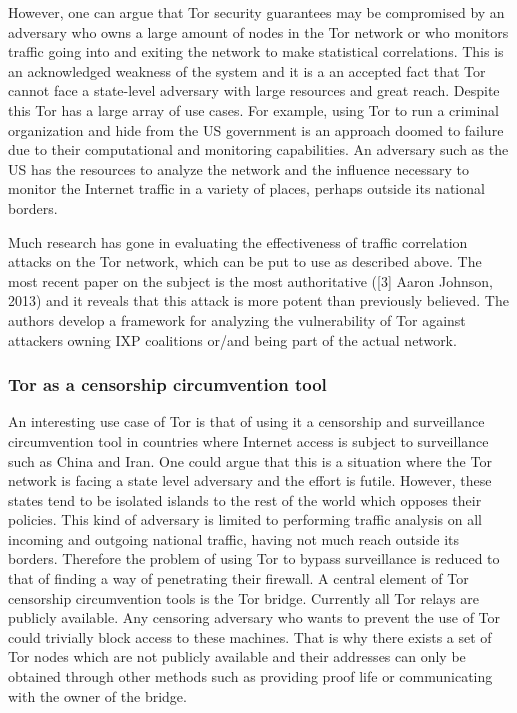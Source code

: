 \documentclass[11pt]{article} %
\begin{document}
However, one can argue that Tor security guarantees may be compromised by an adversary who owns a large amount of nodes in the Tor network or who monitors traffic going into and exiting the network to make statistical correlations. This is an acknowledged weakness of the system and it is a an accepted fact that Tor cannot face a state-level adversary with large resources and great reach. Despite this Tor has a large array of use cases. For example, using Tor to run a criminal organization and hide from the US government is an approach doomed to failure due to their computational and monitoring capabilities. An adversary such as the US has the resources to analyze the network and the influence necessary to monitor the Internet traffic in a variety of places, perhaps outside its national borders.

Much research has gone in evaluating the effectiveness of traffic correlation attacks on the Tor network, which can be put to use as described above. The most recent paper on the subject is the most authoritative ([3] Aaron Johnson, 2013) and it reveals that this attack is more potent than previously believed. The authors develop a framework for analyzing the vulnerability of Tor against attackers owning IXP coalitions or/and being part of the actual network.

\subsubsection{Tor as a censorship circumvention tool}

An interesting use case of Tor is that of using it a censorship and surveillance circumvention tool in countries where Internet access is subject to surveillance such as China and Iran. One could argue that this is a situation where the Tor network is facing a state level adversary and the effort is futile. However, these states tend to be isolated islands to the rest of the world which opposes their policies. This kind of adversary is limited to performing traffic analysis on all incoming and outgoing national traffic, having not much reach outside its borders. Therefore the problem of using Tor to bypass surveillance is reduced to that of finding a way of penetrating their firewall.
A central element of Tor censorship circumvention tools is the Tor bridge. Currently all Tor relays are publicly available. Any censoring adversary who wants to prevent the use of Tor could trivially block access to these machines. That is why there exists a set of Tor nodes which are not publicly available and their addresses can only be obtained through other methods such as providing proof life or communicating with the owner of the bridge. 
\end{document}
